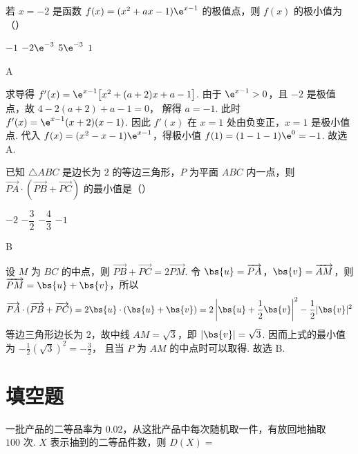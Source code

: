 \begin{problem}
若 \(x=-2\) 是函数 \(f(x)=(x^2+ax-1)\e^{x-1}\) 的极值点，则 \(f(x)\) 的极小值为（\quad）

\choices
    {\(-1\)}
    {\(-2\e^{-3}\)}
    {\(5\e^{-3}\)}
    {\(1\)}
\end{problem}

\begin{answer}
A
\end{answer}

\begin{solution}
求导得
\(f'(x)=\e^{x-1}\bigl[x^2+(a+2)x+a-1\bigr]\).
由于 \(\e^{x-1}>0\)，且 \(-2\) 是极值点，故
\(4-2(a+2)+a-1=0\)，
解得 \(a=-1\). 此时
\(f'(x)=\e^{x-1}(x+2)(x-1)\).
因此 \(f'(x)\) 在 \(x=1\) 处由负变正，\(x=1\) 是极小值点. 代入 \(f(x)=(x^2-x-1)\e^{x-1}\)，得极小值
\(f(1)=(1-1-1)\e^0=-1\).
故选 A.
\end{solution}

\begin{problem}
已知 \(\triangle ABC\) 是边长为 \(2\) 的等边三角形，\(P\) 为平面 \(ABC\) 内一点，则 \(\overrightarrow{PA}\cdot(\overrightarrow{PB}+\overrightarrow{PC})\) 的最小值是（\quad）

\choices
    {\(-2\)}
    {\(-\dfrac32\)}
    {\(-\dfrac43\)}
    {\(-1\)}
\end{problem}

\begin{answer}
B
\end{answer}

\begin{solution}
设 \(M\) 为 \(BC\) 的中点，则 \(\overrightarrow{PB}+\overrightarrow{PC}=2\overrightarrow{PM}\). 令 \(\bs{u}=\overrightarrow{PA}\)，\(\bs{v}=\overrightarrow{AM}\)，则 \(\overrightarrow{PM}=\bs{u}+\bs{v}\)，所以
\[
\overrightarrow{PA}\cdot(\overrightarrow{PB}+\overrightarrow{PC})
=2\bs{u}\cdot(\bs{u}+\bs{v})
=2\left|\bs{u}+\frac12\bs{v}\right|^2-\frac12|\bs{v}|^2
\]
等边三角形边长为 \(2\)，故中线 \(AM=\sqrt3\)，即 \(|\bs{v}|=\sqrt3\). 因而上式的最小值为
\(-\frac12(\sqrt3)^2=-\frac32\)，
且当 \(P\) 为 \(AM\) 的中点时可以取得. 故选 B.
\end{solution}

\section{填空题}

\begin{problem}
一批产品的二等品率为 \(0.02\)，从这批产品中每次随机取一件，有放回地抽取 \(100\text{ 次}\). \(X\) 表示抽到的二等品件数，则 \(D(X)=\)\fillinblank{}
\end{problem}

